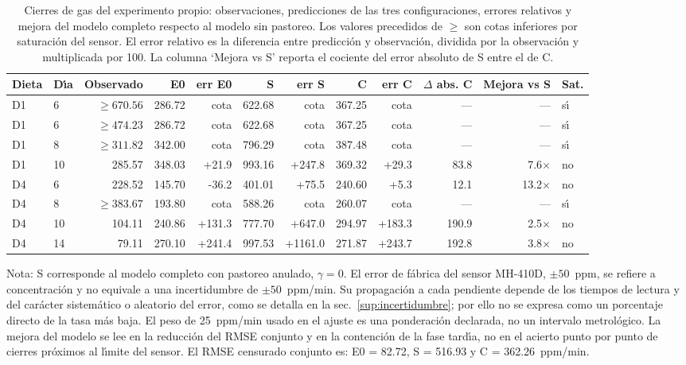 \begin{table}[htbp]
  \centering
  \footnotesize
  \setlength{\tabcolsep}{2.5pt}
  \caption{Cierres de gas del experimento propio: observaciones, predicciones de las tres configuraciones, errores relativos y mejora del modelo completo respecto al modelo sin pastoreo. Los valores precedidos de $\geq$ son cotas inferiores por saturaci\'{o}n del sensor. El error relativo es la diferencia entre predicci\'{o}n y observaci\'{o}n, dividida por la observaci\'{o}n y multiplicada por 100. La columna `Mejora vs S' reporta el cociente del error absoluto de S entre el de C.}
  \label{tab:cierres}
  \begin{tabular}{llrrrrrrrrrl}
    \toprule
    Dieta & D\'{\i}a & Observado & E0 & err E0 & S & err S & C & err C & $\Delta$ abs. C & Mejora vs S & Sat. \\
    \midrule
    D1 & 6  & $\geq 670.56$ & 286.72 & cota & 622.68  & cota & 367.25  & cota & --- & --- & s\'{\i} \\
    D1 & 6  & $\geq 474.23$ & 286.72 & cota & 622.68  & cota & 367.25  & cota & --- & --- & s\'{\i} \\
    D1 & 8  & $\geq 311.82$ & 342.00 & cota & 796.29  & cota & 387.48  & cota & --- & --- & s\'{\i} \\
    D1 & 10 & 285.57        & 348.03 & +21.9 & 993.16  & +247.8 & 369.32  & +29.3 & 83.8 & 7.6$\times$ & no \\
    D4 & 6  & 228.52        & 145.70 & -36.2 & 401.01  & +75.5 & 240.60  & +5.3 & 12.1 & 13.2$\times$ & no \\
    D4 & 8  & $\geq 383.67$ & 193.80 & cota & 588.26  & cota & 260.07  & cota & --- & --- & s\'{\i} \\
    D4 & 10 & 104.11        & 240.86 & +131.3 & 777.70  & +647.0 & 294.97  & +183.3 & 190.9 & 2.5$\times$ & no \\
    D4 & 14 & 79.11         & 270.10 & +241.4 & 997.53  & +1161.0 & 271.87 & +243.7 & 192.8 & 3.8$\times$ & no \\
    \bottomrule
  \end{tabular}
\end{table}

\noindent \footnotesize Nota: S corresponde al modelo completo con pastoreo anulado,
$\gamma = 0$. El error de f\'{a}brica del sensor MH-410D, $\pm 50$~ppm, se refiere
a concentraci\'{o}n y no equivale a una incertidumbre de $\pm 50$~ppm/min. Su
propagaci\'{o}n a cada pendiente depende de los tiempos de lectura y del car\'{a}cter
sistem\'{a}tico o aleatorio del error, como se detalla en la
sec.~\ref{sup:incertidumbre}; por ello no se expresa como un porcentaje
directo de la tasa m\'{a}s baja. El peso de 25~ppm/min usado en el ajuste es una
ponderaci\'{o}n declarada, no un intervalo metrol\'{o}gico. La mejora del modelo se
lee en la reducci\'{o}n del RMSE conjunto y en la contenci\'{o}n de la fase tard\'{\i}a, no
en el acierto punto por punto de cierres pr\'{o}ximos al l\'{\i}mite del sensor. El
RMSE censurado conjunto es: E0 = 82.72, S = 516.93 y C =
362.26~ppm/min.\par


